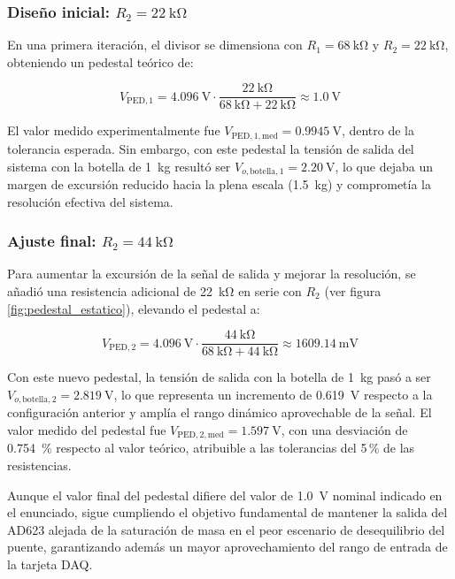 \subsubsection*{Diseño inicial: $R_2 = \SI{22}{\kohm}$}

En una primera iteración, el divisor se dimensiona con $R_1 = \SI{68}{\kohm}$ y $R_2 = \SI{22}{\kohm}$, obteniendo un pedestal teórico de:

\[
    V_{\mathrm{PED,1}} = \SI{4.096}{\V} \cdot
    \frac{\SI{22}{\kohm}}{\SI{68}{\kohm} + \SI{22}{\kohm}}
    \approx \SI{1.0}{\V}
\]

El valor medido experimentalmente fue $V_{\mathrm{PED,1,med}} = \SI{0.9945}{\V}$, dentro de la
tolerancia esperada. Sin embargo, con este pedestal la tensión de salida del sistema con la botella de \SI{1}{\kg} resultó ser $V_{o,\mathrm{botella,1}} = \SI{2.20}{\V}$, lo que dejaba
un margen de excursión reducido hacia la plena escala (\SI{1.5}{\kg}) y comprometía la resolución efectiva del sistema.

\subsubsection*{Ajuste final: $R_2 = \SI{44}{\kohm}$}

Para aumentar la excursión de la señal de salida y mejorar la resolución, se añadió una resistencia adicional de \SI{22}{\kohm} en serie con $R_2$ (ver figura \ref{fig:pedestal_estatico}), elevando el pedestal a:

\[
    V_{\mathrm{PED,2}} = \SI{4.096}{\V} \cdot
    \frac{\SI{44}{\kohm}}{\SI{68}{\kohm} + \SI{44}{\kohm}}
    \approx \SI{1609.14}{\mV}
\]

Con este nuevo pedestal, la tensión de salida con la botella de \SI{1}{\kg} pasó a ser $V_{o,\mathrm{botella,2}} = \SI{2.819}{\V}$, lo que representa un incremento de \SI{0.619}{\V} respecto a la configuración anterior y amplía el rango dinámico aprovechable de la señal. El valor medido del pedestal fue $V_{\mathrm{PED,2,med}} = \SI{1.597}{\V}$, con una desviación de \SI{0.754}{\percent} respecto al valor teórico, atribuible a las tolerancias del 5\,\% de las resistencias.

Aunque el valor final del pedestal difiere del valor de \SI{1.0}{\V} nominal indicado en el enunciado, sigue cumpliendo el objetivo fundamental de mantener la salida del AD623 alejada de la saturación de masa en el peor escenario de desequilibrio del puente, garantizando además un mayor aprovechamiento del rango de entrada de la tarjeta DAQ.

